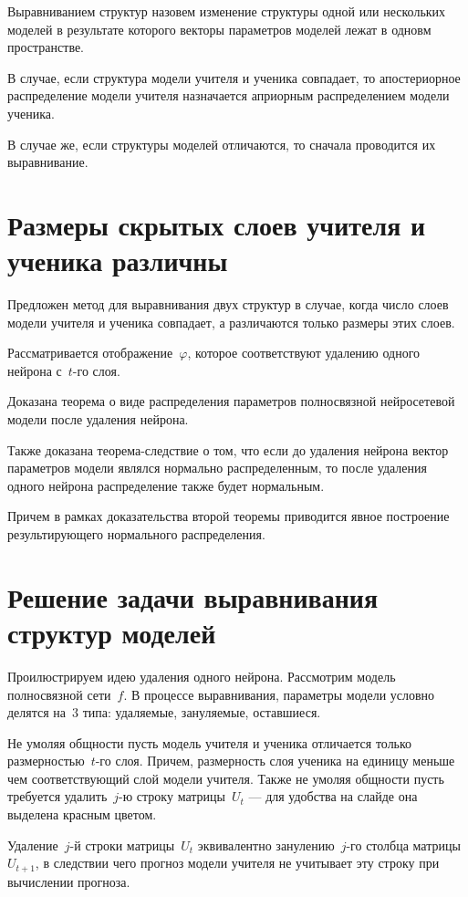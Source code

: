 \documentclass[10pt, twoside]{article}
\begin{document}
Выравниванием структур назовем изменение структуры одной или нескольких моделей в результате которого векторы параметров моделей лежат в одновм пространстве.


В случае, если структура модели учителя и ученика совпадает, то апостериорное распределение модели учителя назначается априорным распределением модели ученика.

В случае же, если структуры моделей отличаются, то сначала проводится их выравнивание.

\section{Размеры скрытых слоев учителя и ученика различны}
Предложен метод для выравнивания двух структур в случае, когда число слоев модели учителя и ученика совпадает, а различаются только размеры этих слоев.

Рассматривается отображение~$\varphi$, которое соответствуют удалению одного нейрона с~$t$-го слоя.

Доказана теорема о виде распределения параметров полносвязной нейросетевой модели после удаления нейрона.

Также доказана теорема-следствие о том, что если до удаления нейрона вектор параметров модели являлся нормально распределенным, то после удаления одного нейрона распределение также будет нормальным.

Причем в рамках доказательства второй теоремы приводится явное построение результирующего нормального распределения.

\section{Решение задачи выравнивания структур моделей}

Проилюстрируем идею удаления одного нейрона. Рассмотрим модель полносвязной сети~$f$. В процессе выравнивания, параметры модели условно делятся на~$3$ типа: удаляемые, зануляемые, оставшиеся.

Не умоляя общности пусть модель учителя и ученика отличается только размерностью~$t$-го слоя. Причем, размерность слоя ученика на единицу меньше чем соответствующий слой модели учителя. Также не умоляя общности пусть требуется удалить~$j$-ю строку матрицы~$U_t$ --- для удобства на слайде она выделена красным цветом.

Удаление~$j$-й строки матрицы~$U_t$ эквивалентно занулению~$j$-го столбца матрицы~$U_{t+1}$, в следствии чего прогноз модели учителя не учитывает эту строку при вычислении прогноза.
\end{document}
